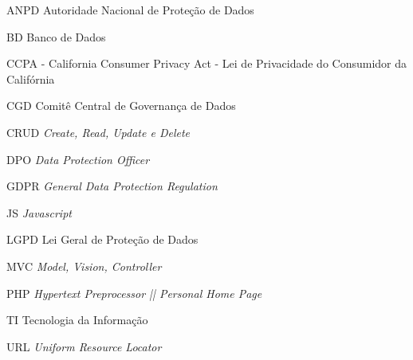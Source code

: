 \documentclass[
	12pt,				%
	openright,			%
	oneside,			%
	a4paper,			%
	english,			%
	french,				%
	spanish,			%
	brazil,				%
	]{abntex2}
\begin{document}
\listoffigures*
\cleardoublepage

\listoftables*
\cleardoublepage

\begin{siglas}
    \item[ANPD] Autoridade Nacional de Proteção de Dados
    \item[BD] Banco de Dados
    \item[CCPA] - California Consumer Privacy Act - Lei de Privacidade do Consumidor da Califórnia
    \item[CGD] Comitê Central de Governança de Dados
    \item[CRUD] \textit{Create, Read, Update e Delete}
    \item[DPO] \textit{Data Protection Officer}
    \item[GDPR] \textit{ General Data Protection Regulation}
    \item [JS] \textit{Javascript}
    \item[LGPD] Lei Geral de Proteção de Dados
    \item[MVC] \textit{Model, Vision, Controller}
    \item[PHP] \textit{Hypertext Preprocessor || Personal Home Page}
    \item[TI] Tecnologia da Informação
    \item[URL] \textit{Uniform Resource Locator}
\end{siglas}


\tableofcontents*



\textual
\setcounter{page}{1}
\end{document}
